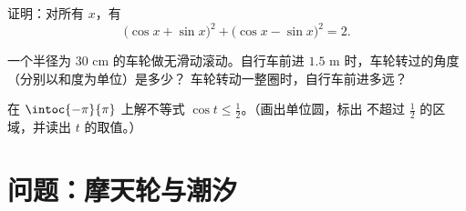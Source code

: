 \begin{exercise}[$\star\star$]\label{exo:g11:trigo:9}
证明：对所有 $x$，有
\[
\bigl(\cos x + \sin x\bigr)^2 + \bigl(\cos x - \sin x\bigr)^2 = 2 .
\]
\end{exercise}

\begin{exercise}[$\star\star$]\label{exo:g11:trigo:10}
一个半径为 $30$ cm 的车轮做无滑动滚动。自行车前进 $1.5$ m 时，车轮转过的角度
（分别以和度为单位）是多少？
车轮转动一整圈时，自行车前进多远？
\end{exercise}

\begin{exercise}[$\star\star\star$]\label{exo:g11:trigo:11}
在 $\intoc{-\pi}{\pi}$ 上解不等式
$\cos t \leq \frac12$。（画出单位圆，标出
不超过 $\frac12$ 的区域，并读出
$t$ 的取值。）
\end{exercise}

\section{问题：摩天轮与潮汐}

